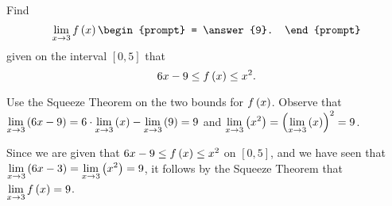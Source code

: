 \documentclass{ximera}
\author{Gregory Hartman \and Matthew Carr}
\begin{document}
\begin{exercise}




Find 
\[
\lim_{x\to3}f\p{x}
\begin{prompt}
= \answer{9}.
\end{prompt}
\]
given on the interval $\left[0,5\right]$ that
\[
6x-9\le f\left(x\right)\le x^2.
\]
\begin{hint}
Use the Squeeze Theorem on the two bounds for $f\left(x\right)$. Observe that $\lim_{x\to3}\p{6x-9}=6\cdot\lim_{x\to3}\p{x}-\lim_{x\to3}\p{9}=9$ and $\lim_{x\to3}\p{x^2}=\p{\lim_{x\to3}\p{x}}^2=9$.
\end{hint}
\begin{hint}
Since we are given that $6x-9\le f\left(x\right)\le x^2$ on $\left[0,5\right]$, and we have seen that $\lim_{x\to3}\p{6x-3}=\lim_{x\to3}\p{x^2}=9$, it follows by the Squeeze Theorem that $\lim_{x\to3}f\p{x}=9$.
\end{hint}
\end{exercise}
\end{document}
